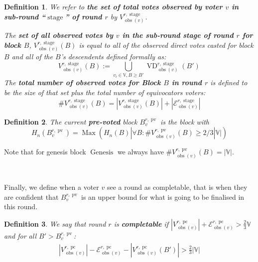 \documentclass{book}
\newcommand{\assign}{:=}
\newcommand{\nosymbol}{}
\newcommand{\tmop}[1]{\ensuremath{\operatorname{#1}}}
\newcommand{\tmstrong}[1]{\textbf{#1}}
\newtheorem{definition}{Definition}
\newtheorem{definition}{Definition}
\begin{document}
\begin{definition}
  We refer to {\tmstrong{the set of total votes observed by voter $v$ in
  sub-round ``$\tmop{stage}$'' of round $r$}} by {\tmstrong{$V^{r,
  \tmop{stage}}_{\tmop{obs} (v)}^{\nosymbol}_{\nosymbol}$}}.
  
  The {\tmstrong{set of all observed votes by $v$ in the sub-round stage of
  round $r$ for block $B$}}, {\tmstrong{$V^{r, \tmop{stage}}_{\tmop{obs} (v)}
  (B)$}} is equal to all of the observed direct votes casted for block $B$ and
  all of the $B$'s descendents defined formally as:
  \[ V^{r, \tmop{stage}}_{\tmop{obs} (v)} (B) \assign \bigcup_{v_i \in
     \mathbb{V}, B \geqslant B'} \tmop{VD}^{r, \tmop{stage}}_{\tmop{obs} (v)}
     (B')_{\nosymbol}^{\nosymbol}_{\nosymbol} \]
  The {\tmstrong{total number of observed votes for Block $B$ in round $r$}}
  is defined to be the size of that set plus the total number of equivocators
  voters:
  \[ \#V^{r, \tmop{stage}}_{\tmop{obs} (v)} (B) = |V^{r,
     \tmop{stage}}_{\tmop{obs} (v)} (B) | + | \mathcal{E}^{r,
     \tmop{stage}}_{\tmop{obs} (v)} | \]
\end{definition}

\begin{definition}
  The current {\tmstrong{pre-voted}} block $B^{r, \tmop{pv}}_v$ is the block
  with
  \[ H_n (B^{r, \tmop{pv}}_v) = \tmop{Max} (H_n (B) | \forall B :
     \#V_{\tmop{obs} (v)}^{r, \tmop{pv}} (B) \geqslant 2 / 3|\mathbb{V}|) \]
\end{definition}

Note that for genesis block $\tmop{Genesis}$ we always have $\#V_{\tmop{obs}
(v)}^{r, \tmop{pv}} (B) = | \mathbb{V} |$.

\

Finally, we define when a voter $v$ see a round as completable, that is when
they are confident that $B_v^{r, \tmop{pv}}$ is an upper bound for what is
going to be finalised in this round. \

\begin{definition}
  \label{defn-grandpa-completable}We say that round $r$ is
  {\tmstrong{completable}} if $|V^{r, \tmop{pc}}_{\tmop{obs} (v)} |
  +\mathcal{E}^{r, \tmop{pc}}_{\tmop{obs} (v)} > \frac{2}{3} \mathbb{V}$ and
  for all $B' > B_v^{r, \tmop{pv}}$:
  \[ \begin{array}{l}
       |V^{r, \tmop{pc}}_{\tmop{obs} (v)} | -\mathcal{E}^{r,
       \tmop{pc}}_{\tmop{obs} (v)} - |V^{r, \tmop{pc}}_{\tmop{obs}
       (v)_{\nosymbol}} (B') | > \frac{2}{3} |\mathbb{V}|
     \end{array} \]
\end{definition}
\end{document}
